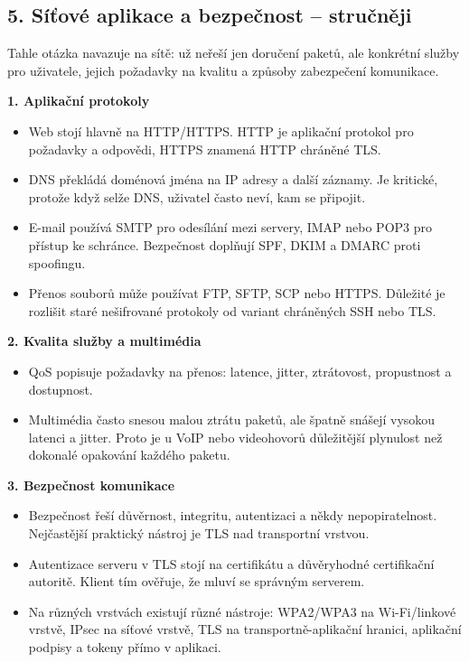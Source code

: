 
\subsection*{5. Síťové aplikace a bezpečnost -- stručněji}
Tahle otázka navazuje na sítě: už neřeší jen doručení paketů, ale konkrétní služby pro uživatele, jejich požadavky na kvalitu a způsoby zabezpečení komunikace.

\textbf{1. Aplikační protokoly}
\begin{itemize}
  \item Web stojí hlavně na HTTP/HTTPS. HTTP je aplikační protokol pro požadavky a odpovědi, HTTPS znamená HTTP chráněné TLS.
  \item DNS překládá doménová jména na IP adresy a další záznamy. Je kritické, protože když selže DNS, uživatel často neví, kam se připojit.
  \item E-mail používá SMTP pro odesílání mezi servery, IMAP nebo POP3 pro přístup ke schránce. Bezpečnost doplňují SPF, DKIM a DMARC proti spoofingu.
  \item Přenos souborů může používat FTP, SFTP, SCP nebo HTTPS. Důležité je rozlišit staré nešifrované protokoly od variant chráněných SSH nebo TLS.
\end{itemize}

\textbf{2. Kvalita služby a multimédia}
\begin{itemize}
  \item QoS popisuje požadavky na přenos: latence, jitter, ztrátovost, propustnost a dostupnost.
  \item Multimédia často snesou malou ztrátu paketů, ale špatně snášejí vysokou latenci a jitter. Proto je u VoIP nebo videohovorů důležitější plynulost než dokonalé opakování každého paketu.
\end{itemize}

\textbf{3. Bezpečnost komunikace}
\begin{itemize}
  \item Bezpečnost řeší důvěrnost, integritu, autentizaci a někdy nepopiratelnost. Nejčastější praktický nástroj je TLS nad transportní vrstvou.
  \item Autentizace serveru v TLS stojí na certifikátu a důvěryhodné certifikační autoritě. Klient tím ověřuje, že mluví se správným serverem.
  \item Na různých vrstvách existují různé nástroje: WPA2/WPA3 na Wi-Fi/linkové vrstvě, IPsec na síťové vrstvě, TLS na transportně-aplikační hranici, aplikační podpisy a tokeny přímo v aplikaci.
\end{itemize}

